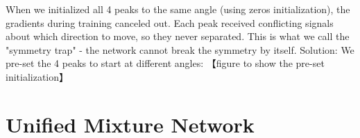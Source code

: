 When we initialized all 4 peaks to the same angle (using zeros initialization), the gradients during training canceled out. Each peak received conflicting signals about which direction to move, so they never separated. This is what we call the "symmetry trap" - the network cannot break the symmetry by itself.
Solution: We pre-set the 4 peaks to start at different angles:
【figure to show the pre-set initialization】










\section{Unified Mixture Network}